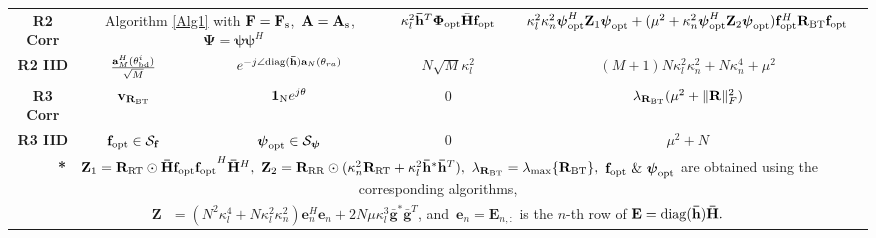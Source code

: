\documentclass[journal,draftclsnofoot,onecolumn,12pt]{IEEEtran}
\begin{document}
\begin{table}[h]
{\begin{tabular}{|c|c|c|c|c|}
\hline
\multicolumn{1}{|c|}{\textbf{R2 Corr}} & \multicolumn{2}{|c|}{\Large{Algorithm \autoref{Alg1}} with \mbox{\normalsize $\mathbf{F}=\mathbf{F}_{\rm s}$, $\mathbf{A}=\mathbf{A}_{\rm s}$,  $\mathbf{\Psi}=\boldsymbol{\psi\psi}^H$} } & $\kappa_l^2\mathbf{\Bar{h}}^T \mathbf{\Phi}_{\rm opt}\Bar{\mathbf{H}}\mathbf{f}_{\rm opt}$ & $\kappa_l^2 \kappa_n^2 \boldsymbol{\psi}_{\rm opt}^H \mathbf{Z}_1 \boldsymbol{\psi}_{\rm opt} +  ( \mu^2 + \kappa_n^2 \boldsymbol{\psi}_{\rm opt}^H \mathbf{Z}_2 \boldsymbol{\psi}_{\rm opt})\mathbf{f}_{\rm opt}^H \mathbf{R_{\rm BT}} \mathbf{f}_{\rm opt}$ \\

\rowcolor{lavender}
\hline
\textbf{R2 IID} & $\frac{\mathbf{a}_M^H(\mathbf{\theta}_{\rm bd}^{i})}{\sqrt{M}}$ & $e^{-j\angle{{\rm diag}(\mathbf{\Bar{h}})\mathbf{a}_N(\mathbf{\theta}_{ra})}}$ & $N \sqrt{M} \kappa_l^2$ & $(M + 1) N\kappa_l^2 \kappa_n^2 + N \kappa_n^4 + \mu^2$ \\ \hline

\rowcolor{lavender}
\textbf{R3 Corr} & $\mathbf{v_{R_{\rm BT}}}$ & $\mathbf{1}_{\rm N} e^{j{\theta}}$ & $0$ & $\lambda_{\mathbf{R}_{\rm BT}} (\mu^2 + \|\mathbf{R}\|_F^2)$  \\ \hline

\rowcolor{lavender}
\textbf{R3 IID} & $\mathbf{f}_{\rm opt} \in \mathcal{S}_\mathbf{f}$ & $\boldsymbol{\psi}_{\rm opt} \in \mathcal{S}_{\boldsymbol{\psi}}$ & $0$ & $\mu^2 + N$  \\
\hline


\multicolumn{5}{|c|}{\textbf{*}~~$\mathbf{Z}_1 = \mathbf{R}_{\rm RT}\odot\mathbf{\Bar{H}f_{\rm opt}f_{\rm opt}}^H\mathbf{\Bar{H}}^H,~\mathbf{Z}_2 = \mathbf{R}_{\rm RR}\odot( \kappa_n^2\mathbf{R}_{\rm RT}+\kappa_l^2\mathbf{\Bar{h}}^*\mathbf{\Bar{h}}^T),~\lambda_{\mathbf{R}_{\rm BT}} = \lambda_{\rm max}\{\mathbf{R}_{\rm BT}\},$ $\mathbf{f}_{\rm opt}~\&~\boldsymbol{\psi}_{\rm opt}$ \Large{are obtained using the corresponding algorithms,}} \\


\multicolumn{5}{|c|}{\hspace{-13cm}$\mathbf{Z} ~~~=(N^2\kappa_l^4+N\kappa_l^2\kappa_n^2)\mathbf{e}_n^H\mathbf{e}_n + 2N\mu\kappa_l^3 \bar{\mathbf{g}}^*\bar{\mathbf{g}}^T$, \Large{and}~$\mathbf{e}_n=\mathbf{E}_{n,:}$ is the $n$-th row of $\mathbf{E} = {\rm diag}(\mathbf{\bar{h}})\mathbf{\Bar{H}}.$} \\
\hline
\end{tabular}}
\vspace{-0.5cm}
\end{table}
\end{document}
